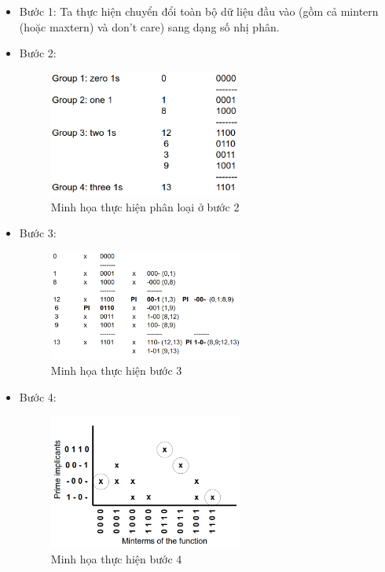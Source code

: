 \documentclass[titlepage]{article} %
\begin{document}
\begin{itemize} \vspace{-0.5cm}
    \item Bước 1: Ta thực hiện chuyển đổi toàn bộ dữ liệu đầu vào (gồm cả mintern (hoặc maxtern) và don't care) sang dạng số nhị phân.
    \item Bước 2:
    \begin{figure}[H] 
	\centering
	\includegraphics[width=0.6\textwidth]{step_2.png}
	\caption[Minh họa thực hiện phân loại ở bước 2]{\centering Minh họa thực hiện phân loại ở bước 2} \label{img:step_2}
    \end{figure} \vspace{-0.5cm} 
    
    \item Bước 3: 
    \begin{figure}[H] 
	\centering
	\includegraphics[width=0.6\textwidth]{step_3.png}
	\caption[Minh họa thực hiện bước 3]{\centering Minh họa thực hiện bước 3} \label{img:step_3}
    \end{figure} \vspace{-0.5cm} 
    
    \item Bước 4: 
    \begin{figure}[H] 
	\centering
	\includegraphics[width=0.6\textwidth]{step_4.png}
	\caption[Minh họa thực hiện bước 4]{\centering Minh họa thực hiện bước 4} \label{img:step_4}
    \end{figure} \vspace{-0.5cm}  
    

\end{itemize}
\end{document}
